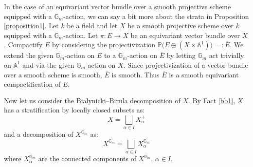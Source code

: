\documentclass{amsart}
\newcommand{\gm}{\mathbb{G}_{m}}
\theoremstyle{plain}
\theoremstyle{definition}
\theoremstyle{remark}
\DeclareMathOperator{\fin}{fin}
\begin{document}


In the case of an equivariant vector bundle over a smooth projective scheme equipped with a $\gm$-action, we can say a bit more about the strata in Proposition \ref{proposition1}. 
Let $k$ be a field and let $X$ be a smooth projective 
scheme over $k$ equipped with a $\mathbb{G}_{m}$-action. Let $\pi:E\rightarrow X$ be an equivariant vector bundle over $X$.
Compactify $E$ by considering the projectivization $
\mathbb{P}\big(E\oplus (X\times\mathbb{A}^{1})\big)=:\overline{E}$. 
We extend the given $\mathbb{G}_{m}$-action on $E$
to a $\gm$-action on $\overline{E}$ by letting
$\gm$ act trivially on $\mathbb A^{1}$ and via the given $\gm$-action on $X$. Since  projectivization of a vector bundle over a smooth scheme is smooth, $\overline{E}$
is smooth. Thus $\overline{E}$ is a smooth equivariant compactification of $E$.

Now let us consider the Bialynicki--Birula decomposition of $X$. By Fact \ref{bb1}, $X$ has a stratification by locally closed subsets as:
\[
X=\bigsqcup_{\alpha\in I}X_{\alpha}^{+}
\]
and a decomposition of $X^{\gm}$ as:
\[
X^{\gm}=\bigsqcup_{\alpha\in I}X_{\alpha}^{\gm}
\]
where $X_{\alpha}^{\gm}$ are the connected components of $X^{\gm}$, $\alpha\in I$.
\end{document}
